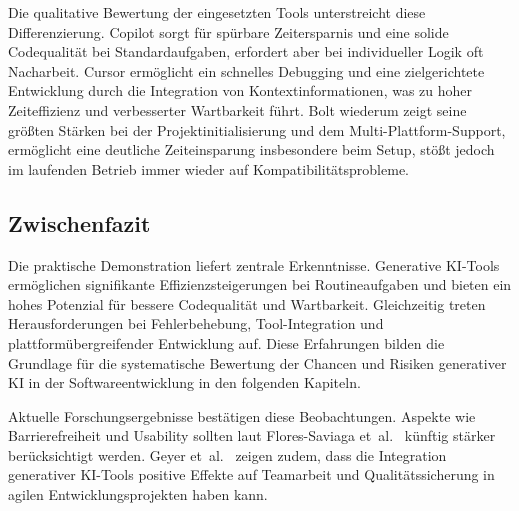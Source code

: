 Die qualitative Bewertung der eingesetzten Tools unterstreicht diese
Differenzierung. Copilot sorgt für spürbare Zeitersparnis und eine solide
Codequalität bei Standardaufgaben, erfordert aber bei individueller Logik oft
Nacharbeit. Cursor ermöglicht ein schnelles Debugging und eine zielgerichtete
Entwicklung durch die Integration von Kontextinformationen, was zu hoher
Zeiteffizienz und verbesserter Wartbarkeit führt. Bolt wiederum zeigt seine
größten Stärken bei der Projektinitialisierung und dem Multi-Plattform-Support,
ermöglicht eine deutliche Zeiteinsparung insbesondere beim Setup, stößt jedoch
im laufenden Betrieb immer wieder auf Kompatibilitätsprobleme.

\subsection{Zwischenfazit}

Die praktische Demonstration liefert zentrale Erkenntnisse. Generative KI-Tools
ermöglichen signifikante Effizienzsteigerungen bei Routineaufgaben und bieten
ein hohes Potenzial für bessere Codequalität und Wartbarkeit. Gleichzeitig
treten Herausforderungen bei Fehlerbehebung, Tool-Integration und
plattformübergreifender Entwicklung auf. Diese Erfahrungen bilden die Grundlage
für die systematische Bewertung der Chancen und Risiken generativer KI in der
Softwareentwicklung in den folgenden Kapiteln.

Aktuelle Forschungsergebnisse bestätigen diese Beobachtungen. Aspekte wie
Barrierefreiheit und Usability sollten laut Flores-Saviaga
et~al.~\cite{flores-saviaga_impact_2025} künftig stärker berücksichtigt werden.
Geyer et~al.~\cite{geyer_case_2025} zeigen zudem, dass die Integration
generativer KI-Tools positive Effekte auf Teamarbeit und Qualitätssicherung in
agilen Entwicklungsprojekten haben kann.

